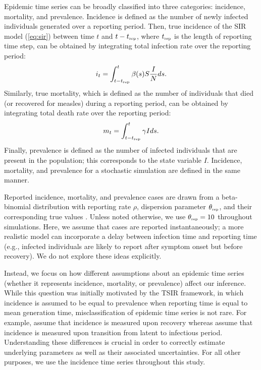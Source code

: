 \documentclass{article}
\newcommand{\eref}[1]{(\ref{eq:#1})}
\newcommand{\tsub}[2]{#1_{{\textrm{\tiny #2}}}}
\begin{document}
Epidemic time series can be broadly classified into three categories: incidence, mortality, and prevalence.
Incidence is defined as the number of newly infected individuals generated over a reporting period.
Then, true incidence of the SIR model \eref{sir} between time $t$ and $t-\tsub{t}{rep}$, where $\tsub{t}{rep}$ is the length of reporting time step, can be obtained by integrating total infection rate over the reporting period:
\begin{equation}
i_t = \int_{t-\tsub{t}{rep}}^{t} \beta(s) S \frac{I}{N} ds.
\end{equation}
Similarly, true mortality, which is defined as the number of individuals that died (or recovered for measles) during a reporting period, can be obtained by integrating total death rate over the reporting period:
\begin{equation}
m_t = \int_{t-\tsub{t}{rep}}^{t} \gamma I ds.
\end{equation}
Finally, prevalence is defined as the number of infected individuals that are present in the population; 
this corresponds to the state variable $I$. 
Incidence, mortality, and prevalence for a stochastic simulation are defined in the same manner.

Reported incidence, mortality, and prevalence cases are drawn from a beta-binomial distribution with reporting rate $\rho$, dispersion parameter $\tsub{\theta}{rep}$, and their corresponding true values \citep{morris1997disentangling}.
Unless noted otherwise, we use $\tsub{\theta}{rep} = 10$ throughout simulations.
Here, we assume that cases are reported instantaneously; 
a more realistic model can incorporate a delay between infection time and reporting time (e.g., infected individuals are likely to report after symptom onset but before recovery).
We do not explore these ideas explicitly.

Instead, we focus on how different assumptions about an epidemic time series (whether it represents incidence, mortality, or prevalence) affect our inference.
While this question was initially motivated by the TSIR framework, in which incidence is assumed to be equal to prevalence when reporting time is equal to mean generation time, 
misclassification of epidemic time series is not rare.
For example, \cite{he2009plug} assume that incidence is measured upon recovery whereas \cite{hooker2010parameterizing, althaus2014estimating} assume that incidence is measured upon transition from latent to infectious period.
Understanding these differences is crucial in order to correctly estimate underlying parameters as well as their associated uncertainties.
For all other purposes, we use the incidence time series throughout this study.
\end{document}
